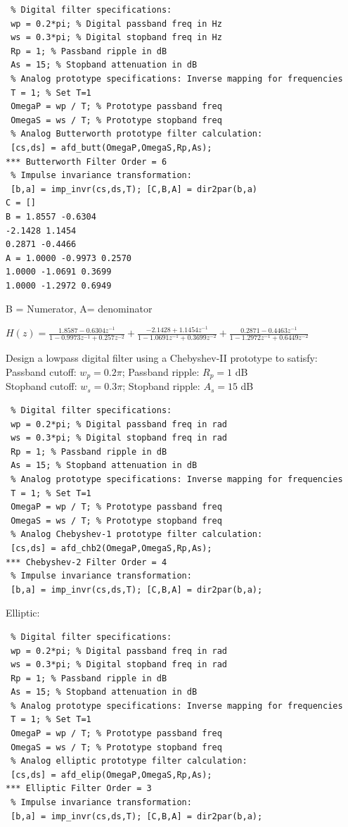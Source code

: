\documentclass{article}
\begin{document}
\begin{lstlisting}
 % Digital filter specifications:
 wp = 0.2*pi; % Digital passband freq in Hz
 ws = 0.3*pi; % Digital stopband freq in Hz
 Rp = 1; % Passband ripple in dB
 As = 15; % Stopband attenuation in dB
 % Analog prototype specifications: Inverse mapping for frequencies
 T = 1; % Set T=1
 OmegaP = wp / T; % Prototype passband freq
 OmegaS = ws / T; % Prototype stopband freq
 % Analog Butterworth prototype filter calculation:
 [cs,ds] = afd_butt(OmegaP,OmegaS,Rp,As);
*** Butterworth Filter Order = 6
 % Impulse invariance transformation:
 [b,a] = imp_invr(cs,ds,T); [C,B,A] = dir2par(b,a)
C = []
B = 1.8557 -0.6304
-2.1428 1.1454
0.2871 -0.4466
A = 1.0000 -0.9973 0.2570
1.0000 -1.0691 0.3699
1.0000 -1.2972 0.6949
\end{lstlisting}
B = Numerator, A= denominator
\begin{center}
$H(z) = \frac{1.8587-0.6304z^{-1}}{1-0.9973z^{-1}+0.257z^{-2}}+\frac{-2.1428 + 1.1454z^{-1}}{1-1.0691z^{-1}+0.3699z^{-2}}+\frac{0.2871-0.4463z^{-1}}{1-1.2972z^{-1}+0.6449z^{-2}}$
\end{center}
Design a lowpass digital filter using a Chebyshev-II prototype to satisfy: \\
\vspace{1em}
Passband cutoff: $w_p=0.2\pi$; Passband ripple: $R_p=1$ dB \\
\vspace{1em}
Stopband cutoff: $w_s=0.3\pi$; Stopband ripple: $A_s =15$ dB \\
\vspace{1em}
\begin{lstlisting}
 % Digital filter specifications:
 wp = 0.2*pi; % Digital passband freq in rad
 ws = 0.3*pi; % Digital stopband freq in rad
 Rp = 1; % Passband ripple in dB
 As = 15; % Stopband attenuation in dB
 % Analog prototype specifications: Inverse mapping for frequencies
 T = 1; % Set T=1
 OmegaP = wp / T; % Prototype passband freq
 OmegaS = ws / T; % Prototype stopband freq
 % Analog Chebyshev-1 prototype filter calculation:
 [cs,ds] = afd_chb2(OmegaP,OmegaS,Rp,As);
*** Chebyshev-2 Filter Order = 4
 % Impulse invariance transformation:
 [b,a] = imp_invr(cs,ds,T); [C,B,A] = dir2par(b,a);    
\end{lstlisting}
Elliptic:
\begin{lstlisting}
 % Digital filter specifications:
 wp = 0.2*pi; % Digital passband freq in rad
 ws = 0.3*pi; % Digital stopband freq in rad
 Rp = 1; % Passband ripple in dB
 As = 15; % Stopband attenuation in dB   
 % Analog prototype specifications: Inverse mapping for frequencies
 T = 1; % Set T=1
 OmegaP = wp / T; % Prototype passband freq
 OmegaS = ws / T; % Prototype stopband freq
 % Analog elliptic prototype filter calculation:
 [cs,ds] = afd_elip(OmegaP,OmegaS,Rp,As);
*** Elliptic Filter Order = 3
 % Impulse invariance transformation:
 [b,a] = imp_invr(cs,ds,T); [C,B,A] = dir2par(b,a);
\end{lstlisting}
\end{document}
